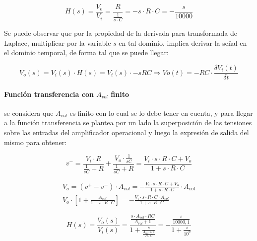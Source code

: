 \begin{equation}
	H(s) = \frac{V_o}{V_i} = \frac{R}{ \frac{1}{s \cdot C}} = -s \cdot R  \cdot C
	= -\frac{s}{10000}
\end{equation}

Se puede observar que por la propiedad de la derivada para transformada de Laplace, multiplicar por la variable $s$ en tal dominio, implica derivar la señal en el dominio temporal, de forma tal que se puede llegar:

\begin{equation}
	V_o(s) = V_i(s) \cdot H(s) = V_i(s) \cdot -sRC \Rightarrow
	Vo(t) = -RC \cdot \frac{\delta V_i(t)}{\delta t}
\end{equation}


\paragraph*{Funci\'on transferencia con $A_{vol}$ finito}se considera que $A_{vol}$ es finito con lo cual se lo debe tener en cuenta, y para llegar a la funci\'on transferencia se plantea por un lado la superposici\'on de las tensiones sobre las entradas del amplificador operacional y luego la expresi\'on de salida del mismo para obtener:

\begin{equation}
	v^{-} = \frac{V_i \cdot R}{\frac{1}{sC} + R} + \frac{V_o \cdot \frac{1}{sC}}{\frac{1}{sC} + R}
	= \frac{V_i \cdot s \cdot R \cdot C + V_o}{1 + s \cdot R \cdot C}
\end{equation}

\begin{align}
	V_o = (v^{+} - v^{-}) \cdot A_{vol}
	= - \frac{V_i \cdot s \cdot R \cdot C + V_o}{1 + s \cdot R \cdot C} \cdot A_{vol} \\
	V_o \cdot \left[ 1 + \frac{A_{vol}}{1 + s \cdot R \cdot C} \right]
	= - \frac{V_i \cdot s \cdot R \cdot C \cdot A_{vol}}{1 + s \cdot R \cdot C}
\end{align}

\begin{equation}
	H(s) = \frac{V_o(s)}{V_i(s)} = \frac{\frac{s \cdot A_{vol} \cdot RC}{A_{vol} + 1}}{1 + \frac{s}{\frac{A_{vol} + 1}{R \cdot C}}}
	= - \frac{\frac{s}{10000,1}}{1 + \frac{s}{10^{9}}}
	\label{eq:derivador_sin_finito}
\end{equation}

